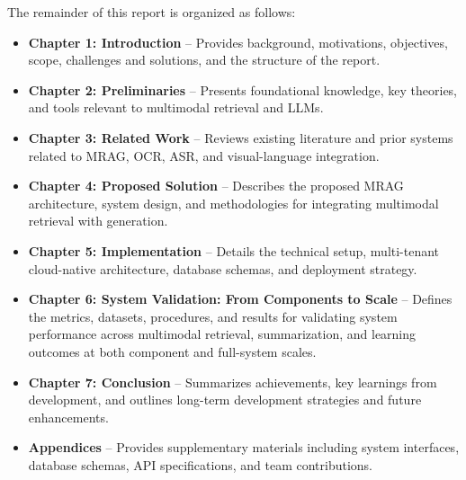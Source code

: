 The remainder of this report is organized as follows:

\begin{itemize}
    \item \textbf{Chapter 1: Introduction} – Provides background, motivations, objectives, scope, challenges and solutions, and the structure of the report.
    \item \textbf{Chapter 2: Preliminaries} – Presents foundational knowledge, key theories, and tools relevant to multimodal retrieval and LLMs.
    \item \textbf{Chapter 3: Related Work} – Reviews existing literature and prior systems related to MRAG, OCR, ASR, and visual-language integration.
    \item \textbf{Chapter 4: Proposed Solution} – Describes the proposed MRAG architecture, system design, and methodologies for integrating multimodal retrieval with generation.
    \item \textbf{Chapter 5: Implementation} – Details the technical setup, multi-tenant cloud-native architecture, database schemas, and deployment strategy.
    \item \textbf{Chapter 6: System Validation: From Components to Scale} – Defines the metrics, datasets, procedures, and results for validating system performance across multimodal retrieval, summarization, and learning outcomes at both component and full-system scales.
    \item \textbf{Chapter 7: Conclusion} – Summarizes achievements, key learnings from development, and outlines long-term development strategies and future enhancements.
    \item \textbf{Appendices} – Provides supplementary materials including system interfaces, database schemas, API specifications, and team contributions.
\end{itemize}

\newpage
